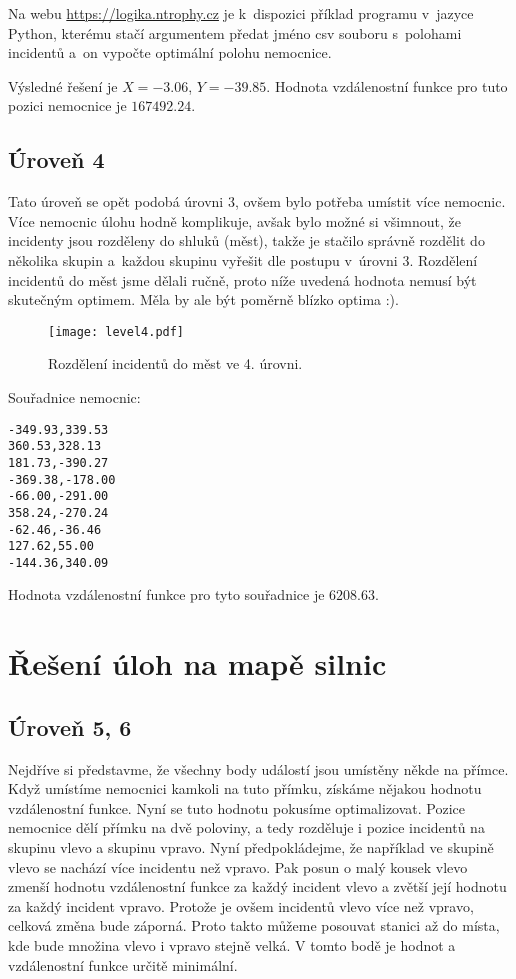 \documentclass[12pt,a4paper]{article}
\begin{document}
Na webu \url{https://logika.ntrophy.cz} je k~dispozici příklad programu
v~jazyce Python, kterému stačí argumentem předat jméno csv souboru s~polohami
incidentů a~on vypočte optimální polohu nemocnice.

Výsledné řešení je $X=-3.06$, $Y=-39.85$. Hodnota vzdálenostní funkce pro tuto
pozici nemocnice je $167492.24$.

\subsection*{Úroveň 4}
Tato úroveň se opět podobá úrovni 3, ovšem bylo potřeba umístit více nemocnic.
Více nemocnic úlohu hodně komplikuje, avšak bylo možné si všimnout, že
incidenty jsou rozděleny do shluků (měst), takže je stačilo správně rozdělit do
několika skupin a~každou skupinu vyřešit dle postupu v~úrovni 3. Rozdělení
incidentů do měst jsme dělali ručně, proto níže uvedená hodnota nemusí být
skutečným optimem. Měla by ale být poměrně blízko optima :).

\begin{figure}[ht]
\centering
\texttt{[image: level4.pdf]}
\caption{Rozdělení incidentů do měst ve 4. úrovni.}
\end{figure}

Souřadnice nemocnic:
\begin{verbatim}
-349.93,339.53
360.53,328.13
181.73,-390.27
-369.38,-178.00
-66.00,-291.00
358.24,-270.24
-62.46,-36.46
127.62,55.00
-144.36,340.09
\end{verbatim}

Hodnota vzdálenostní funkce pro tyto souřadnice je $6208.63$.

\section*{Řešení úloh na mapě silnic}
\subsection*{Úroveň 5, 6}
Nejdříve si představme, že všechny body událostí jsou umístěny někde na přímce. Když umístíme nemocnici kamkoli na tuto přímku, získáme nějakou hodnotu vzdálenostní funkce.
Nyní se tuto hodnotu pokusíme optimalizovat. Pozice nemocnice dělí přímku na dvě poloviny, a tedy rozděluje i pozice incidentů na skupinu vlevo a skupinu vpravo.
Nyní předpokládejme, že například ve skupině vlevo se nachází více incidentu než vpravo. Pak posun o malý kousek vlevo zmenší hodnotu vzdálenostní funkce za každý incident vlevo a zvětší její hodnotu za každý incident vpravo.
Protože je ovšem incidentů vlevo více než vpravo, celková změna bude záporná. Proto takto můžeme posouvat stanici až do místa, kde bude množina vlevo i vpravo stejně velká.
V tomto bodě je hodnot a vzdálenostní funkce určitě minimální.
\end{document}
